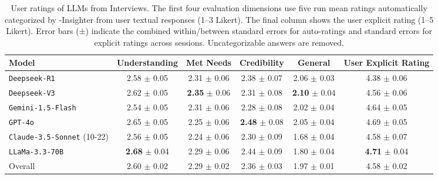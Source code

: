 \begin{table*}[t]
\small
\centering
\caption{\label{table:ratings} User ratings of LLMs from \method{} Interviews. The first four evaluation dimensions use five run mean ratings automatically categorized by \method-Insighter from user textual responses (1--3 Likert). The final column shows the user explicit rating (1--5 Likert). Error bars (±) indicate the combined within/between standard errors for auto-ratings and standard errors for explicit ratings across sessions. Uncategorizable answers are removed.}
\vspace{-0.2cm}
\begin{tabular}{l|cccc|c}
\toprule
Model & \textbf{Understanding} & \textbf{Met Needs} & \textbf{Credibility} & \textbf{General} & \textbf{User Explicit Rating}\\
\hline
\texttt{Deepseek-R1} & 2.58 $\pm$ 0.05 & 2.31 $\pm$ 0.06 & 2.38 $\pm$ 0.07 & 2.06 $\pm$ 0.03 & 4.38 $\pm$ 0.06 \\
\texttt{Deepseek-V3} & 2.62 $\pm$ 0.05 & \textbf{2.35} $\pm$ 0.06 & 2.31 $\pm$ 0.08 & \textbf{2.10} $\pm$ 0.04 & 4.56 $\pm$ 0.06 \\
\texttt{Gemini-1.5-Flash} & 2.54 $\pm$ 0.05 & 2.31 $\pm$ 0.06 & 2.28 $\pm$ 0.08 & 2.02 $\pm$ 0.04 & 4.64 $\pm$ 0.05 \\
\texttt{GPT-4o} & 2.65 $\pm$ 0.05 & 2.25 $\pm$ 0.06 & \textbf{2.48} $\pm$ 0.08 & 2.05 $\pm$ 0.04 & 4.69 $\pm$ 0.05 \\
\texttt{Claude-3.5-Sonnet} (10-22) & 2.56 $\pm$ 0.05 & 2.24 $\pm$ 0.06 & 2.30 $\pm$ 0.09 & 1.68 $\pm$ 0.04 & 4.58 $\pm$ 0.07 \\
\texttt{LLaMa-3.3-70B} & \textbf{2.68} $\pm$ 0.04 & 2.29 $\pm$ 0.06 & 2.44 $\pm$ 0.09 & 1.80 $\pm$ 0.04 & \textbf{4.71} $\pm$ 0.04 \\
\hline
{Overall} & 2.60 $\pm$ 0.02 & 2.29 $\pm$ 0.02 & 2.36 $\pm$ 0.03 & 1.97 $\pm$ 0.01 & 4.58 $\pm$ 0.02 \\
\bottomrule
\end{tabular}
\end{table*}